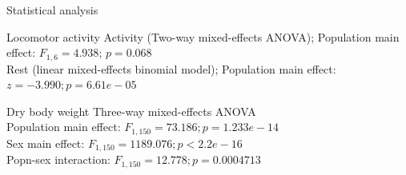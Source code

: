 \documentclass{beamer}
\begin{document}
\begin{frame}{Statistical analysis}
	\begin{block}{Locomotor activity}
		\small
		Activity (Two-way mixed-effects ANOVA); Population main effect: $F_{1,6}=4.938$; $p=0.068$\\
		Rest (linear mixed-effects binomial model); Population main effect: $z=-3.990; p=6.61e-05$
	\end{block}

	\begin{block}{Dry body weight}
		\small
		Three-way mixed-effects ANOVA\\
		Population main effect: $F_{1,150}=73.186; p=1.233e-14$\\
		Sex main effect: $F_{1,150}=1189.076; p<2.2e-16$\\
		Popn-sex interaction: $F_{1,150}=12.778; p=0.0004713$
		\end{block}
\end{frame}
\end{document}

